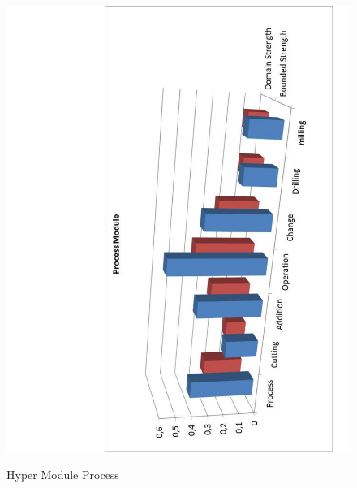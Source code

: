 \begin{figure}
	\centering
	\scriptsize
	\begin{minipage}{.55\textwidth}
		\includegraphics[scale=0.35, angle=-90]{figure-chapterIV/fig4-20}\\
		\caption{Hyper Module Process}
		\label{figure4-20}
	\end{minipage}%
	\begin{minipage}{.5\textwidth}

\end{minipage}
\end{figure}
